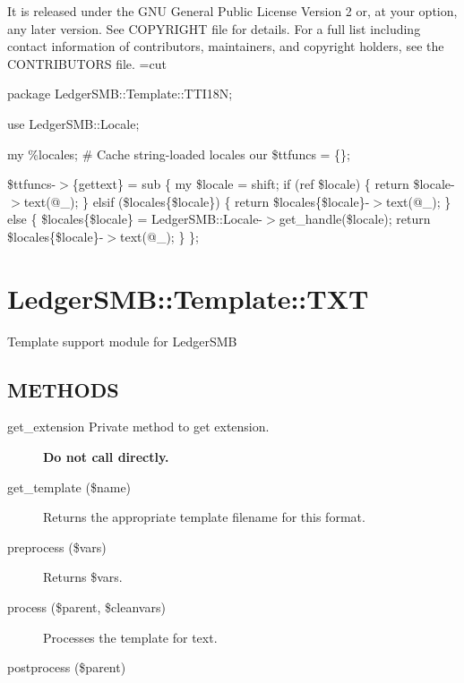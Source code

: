 \begin{description}
\begin{description}
\begin{description}
\begin{description}
\begin{description}
\begin{description}
\begin{description}
\begin{description}
\begin{description}
\begin{description}
It is released under the GNU General Public License Version 2 or, at your 
option, any later version.  See COPYRIGHT file for details.  For a full list 
including contact information of contributors, maintainers, and copyright 
holders, see the CONTRIBUTORS file.
=cut



package LedgerSMB::Template::TTI18N;



use LedgerSMB::Locale;



my \%locales; \# Cache string-loaded locales
our \$ttfuncs = \{\};



\$ttfuncs-$>$\{gettext\} = sub \{
	my \$locale = shift;
	if (ref \$locale) \{
		return \$locale-$>$text(@\_);
	\} elsif (\$locales\{\$locale\}) \{
		return \$locales\{\$locale\}-$>$text(@\_);
	\} else \{
		\$locales\{\$locale\} = LedgerSMB::Locale-$>$get\_handle(\$locale);
		return \$locales\{\$locale\}-$>$text(@\_);
	\}
\};

\section{LedgerSMB::Template::TXT\label{LedgerSMB::Template::TXT}}


Template support module for LedgerSMB

\subsection*{METHODS\label{LedgerSMB::Template::TXT_METHODS}}
\begin{description}

\item[{get\_extension Private method to get extension.}] \textbf{Do not call directly.}
\item[{get\_template (\$name)}] \mbox{}

Returns the appropriate template filename for this format.


\item[{preprocess (\$vars)}] \mbox{}

Returns \$vars.


\item[{process (\$parent, \$cleanvars)}] \mbox{}

Processes the template for text.


\item[{postprocess (\$parent)}] \mbox{}


\end{description}
\end{description}
\end{description}
\end{description}
\end{description}
\end{description}
\end{description}
\end{description}
\end{description}
\end{description}
\end{description}
